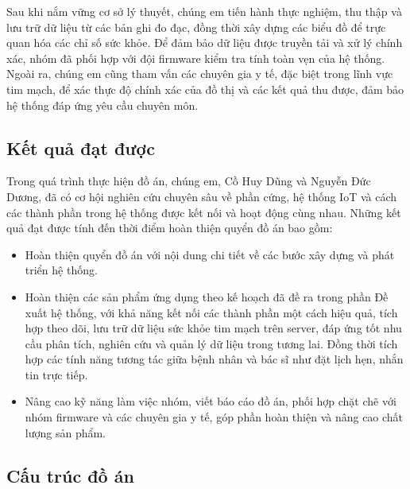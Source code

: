Sau khi nắm vững cơ sở lý thuyết, chúng em tiến hành thực nghiệm, thu thập và lưu trữ dữ liệu từ các bản ghi đo đạc, đồng thời xây dựng các biểu đồ để trực quan hóa các chỉ số sức khỏe. Để đảm bảo dữ liệu được truyền tải và xử lý chính xác, nhóm đã phối hợp với đội firmware kiểm tra tính toàn vẹn của hệ thống.
Ngoài ra, chúng em cũng tham vấn các chuyên gia y tế, đặc biệt trong lĩnh vực tim mạch, để xác thực độ chính xác của đồ thị và các kết quả thu được, đảm bảo hệ thống đáp ứng yêu cầu chuyên môn.
\subsection*{Kết quả đạt được}

Trong quá trình thực hiện đồ án, chúng em, Cồ Huy Dũng và Nguyễn Đức Dương, đã có cơ hội nghiên cứu chuyên sâu về phần cứng, hệ thống IoT và cách các thành phần trong hệ thống được kết nối và hoạt động cùng nhau.
Những kết quả đạt được tính đến thời điểm hoàn thiện quyển đồ án bao gồm:

\begin{adjustwidth}{1.5em}{}
  \begin{itemize}
      \item Hoàn thiện quyển đồ án với nội dung chi tiết về các bước xây dựng và phát triển hệ thống.
      \item Hoàn thiện các sản phẩm ứng dụng theo kế hoạch đã đề ra trong phần Đề xuất hệ thống, với khả năng kết nối các thành phần một cách hiệu quả, tích hợp theo dõi, lưu trữ dữ liệu sức khỏe tim mạch trên server, đáp ứng tốt nhu cầu phân tích, nghiên cứu và quản lý dữ liệu trong tương lai.
      Đồng thời tích hợp các tính năng tương tác giữa bệnh nhân và bác sĩ như đặt lịch hẹn, nhắn tin trực tiếp.
      \item Nâng cao kỹ năng làm việc nhóm, viết báo cáo đồ án, phối hợp chặt chẽ với nhóm firmware và các chuyên gia y tế, góp phần hoàn thiện và nâng cao chất lượng sản phẩm.
    \end{itemize}
  \end{adjustwidth}
\subsection*{Cấu trúc đồ án}

